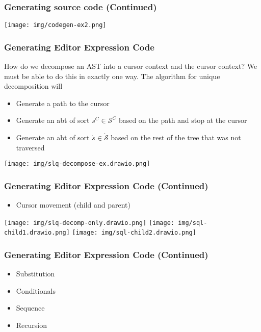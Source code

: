 \documentclass[t,24pt,aspectratio=169]{beamer}
\begin{document}
\begin{frame}[hvid]
    \frametitle{Generating source code (Continued)}
    \begin{center}
        \texttt{[image: img/codegen-ex2.png]}
    \end{center}
\end{frame}

\begin{frame}[hvid]
    \frametitle{Generating Editor Expression Code}
    \begin{multicols}{2}
       How do we decompose an AST into a cursor context and the cursor
       context? We must be able to do this in exactly one way. The
       algorithm for unique decomposition will
                  \begin{itemize}
                      \item Generate a path to the cursor
                      \item Generate an abt of sort $s^C \in \mathcal{S}^C$ based on the path and stop at the cursor
                      \item Generate an abt of sort $\dot{s} \in \dot{\mathcal{S}}$
                            based on the rest of the tree that was not traversed
                  \end{itemize}
        \columnbreak
        \texttt{[image: img/slq-decompose-ex.drawio.png]}
    \end{multicols}
\end{frame}

\begin{frame}[hvid]
    \frametitle{Generating Editor Expression Code (Continued)}
    \begin{itemize}
        \item Cursor movement (child and parent)
    \end{itemize}
    \texttt{[image: img/slq-decomp-only.drawio.png]}
    \texttt{[image: img/sql-child1.drawio.png]}
    \texttt{[image: img/sql-child2.drawio.png]}
\end{frame}

\begin{frame}[hvid]
    \frametitle{Generating Editor Expression Code (Continued)}
    \begin{itemize}
        \item Substitution
        \item Conditionals
        \item Sequence
        \item Recursion
    \end{itemize}
\end{frame}
\end{document}
